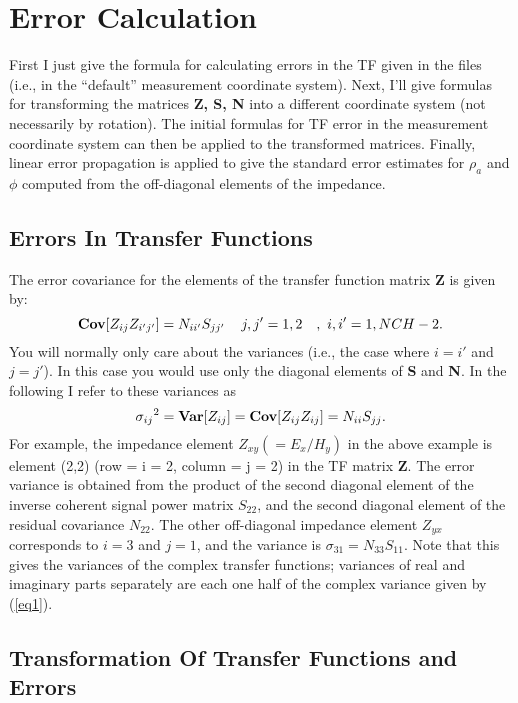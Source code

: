\section{Error Calculation}

First I just give the formula for calculating errors in the
TF given in the files (i.e., in the ``default''
measurement coordinate system).  Next, I'll give formulas for
transforming the matrices {\bf Z, S, N} into a different
coordinate system (not necessarily by rotation).  The initial formulas
for TF error in the measurement coordinate system
can then be applied to the transformed 
matrices.  Finally, linear error propagation is applied to give
the standard error estimates for $\rho_a$ and $\phi$ computed
from the off-diagonal elements of the impedance.

\subsection{Errors In Transfer Functions}

The error covariance for the elements of the transfer
function matrix {\bf Z} is given by:
\begin{equation}
{\bf Cov} [ Z_{ij} Z_{i'j'} ] = N_{ii'} S_{jj'} \,\,\,\,\,\,\, j, j' = 1,2 
\,\,\,\,\,\,,\  i, i' = 1,NCH-2   .
\label{eq1}
\end{equation}
You will normally only care about the variances (i.e., the case where
$i = i'$ and $j = j'$).  In this case you would use only the
diagonal elements of {\bf S} and {\bf N}.  In the following I
refer to these variances as
\begin{equation}
{\sigma_{ij}}^2 = 
{\bf Var} [ Z_{ij} ] = {\bf Cov} [ Z_{ij} Z_{ij} ] = 
N_{ii} S_{jj} .
\label{eq2}
\end{equation}
For example, the impedance element $Z_{xy} ( = E_x / H_y )$
in the above example is element (2,2) (row = i = 2, column = j = 2)
in the TF matrix {\bf Z}.  The error variance is obtained from the product
of the second diagonal element of the inverse coherent signal
power matrix $S_{22}$, and the second diagonal element of the residual
covariance $N_{22}$.  The other off-diagonal impedance element $Z_{yx}$
corresponds to $i = 3$ and $j = 1$, and the variance 
is $\sigma_{31} = N_{33} S_{11}$.
Note that this gives the variances of the complex transfer
functions; variances of real and
imaginary parts separately are each one half of the complex variance
given by (\ref{eq1}).

\subsection{Transformation Of Transfer Functions and Errors}

